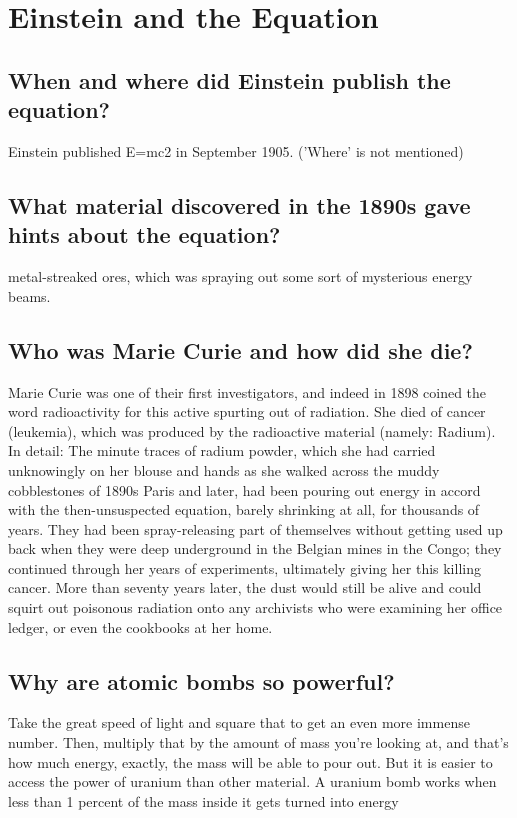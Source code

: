 %

\section{Einstein and the Equation}

\subsection*{When and where did Einstein publish the equation?}
Einstein published E=mc2 in September 1905. ('Where' is not mentioned)

\subsection*{What material discovered in the 1890s gave hints about the equation?}
metal-streaked ores, which was spraying out some sort of mysterious energy beams.

\subsection*{Who was Marie Curie and how did she die?}
Marie Curie was one of their first investigators, and indeed in 1898 coined the word radioactivity for this active spurting out of radiation. She died of cancer (leukemia), which was produced by the radioactive material (namely: Radium).
In detail: The minute traces of radium powder, which she had carried unknowingly on her blouse and hands as she walked across the muddy cobblestones of 1890s Paris and later, had been pouring out energy in accord with the then-unsuspected equation, barely shrinking at all, for thousands of years. They had been spray-releasing part of themselves without getting used up back when they were deep underground in the Belgian mines in the Congo; they continued through her years of experiments, ultimately giving her this killing cancer. More than seventy years later, the dust would still be alive and could squirt out poisonous radiation onto any archivists who were examining her office ledger, or even the cookbooks at her home.

\subsection*{Why are atomic bombs so powerful?}
Take the great speed of light and square that to get an even more immense number. Then, multiply that by the amount of mass you're looking at, and that's how much energy, exactly, the mass will be able to pour out. But it is easier to access the power of uranium than other material. A uranium bomb works when less than 1 percent of the mass inside it gets turned into energy

